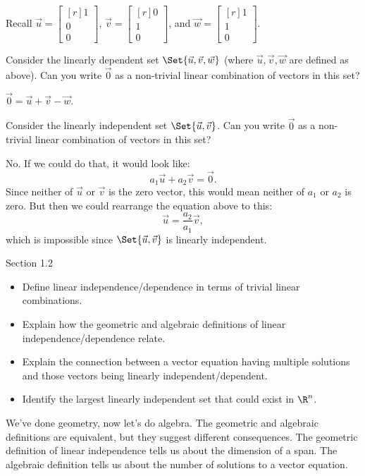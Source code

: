 \documentclass{problemset}
\newcommand{\mat}[1]{\begin{bmatrix*}[r]#1\end{bmatrix*}}
\begin{document}
	\question
		Recall $\vec u=\mat{1\\0\\0}$, $\vec v=\mat{0\\1\\0}$, and $\vec w=\mat{1\\1\\0}$.
	\begin{parts}
		\item Consider the linearly dependent 
			set $\Set{\vec u,\vec v,\vec w}$ (where $\vec u,\vec v,\vec w$ are 
			defined as above). Can you write $\vec 0$ as a non-trivial linear 
			combination of vectors in this set?
			\begin{solution}[inline]
				$\vec 0 = \vec u + \vec v - \vec w$. 
			\end{solution}
		\item Consider the linearly independent set $\Set{\vec u,\vec v}$. 
			Can you write $\vec 0$ as a non-trivial linear combination of 
			vectors in this set?
			\begin{solution}
				No. If we could do that, it would look like:
				\[
					a_1 \vec u + a_2 \vec v = \vec 0.
				\]
				Since neither of $\vec u$ or $\vec v$ is the zero vector, 
				this would mean neither of $a_1$ or $a_2$ is zero. But
				then we could rearrange the equation above to this:
				\[
					\vec u = \frac{a_2}{a_1} \vec v,
				\]
				which is impossible since $\Set{\vec u, \vec v}$ is linearly
				independent. 
			\end{solution}
	\end{parts}


\begin{lesson}
	\newpage

	Section 1.2

	\begin{itemize}
		\item Define linear independence/dependence in terms of trivial linear combinations.
		\item Explain how the geometric and algebraic definitions of linear independence/dependence relate.
		\item Explain the connection between a vector equation having multiple
			solutions and those vectors being linearly independent/dependent.
		\item Identify the largest linearly independent set that could exist in $\R^n$.
	\end{itemize}

	We've done geometry, now let's do algebra. The geometric and algebraic definitions
	are equivalent, but they suggest different consequences. The geometric definition
	of linear independence tells us about the dimension of a span. The algebraic
	definition tells us about the number of solutions to a vector equation.

	\newpage
\end{lesson}
\end{document}
